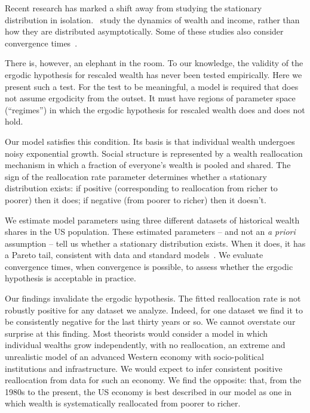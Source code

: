 Recent research has marked a shift away from studying the stationary distribution in isolation.~\cite{gabaix2015dynamics,BermanBen-JacobShapira2016,kaymak2016evolution,berman2017revisiting} study the dynamics of wealth and income, rather than how they are distributed asymptotically. Some of these studies also consider convergence times~\cite{gabaix2015dynamics,berman2017revisiting}.

There is, however, an elephant in the room. To our knowledge, the validity of the ergodic hypothesis for rescaled wealth has never been tested empirically. Here we present such a test. For the test to be meaningful, a model is required that does not assume ergodicity from the outset. It must have regions of parameter space (``regimes'') in which the ergodic hypothesis for rescaled wealth does and does not hold.

Our model satisfies this condition. Its basis is that individual wealth undergoes noisy exponential growth. Social structure is represented by a wealth reallocation mechanism in which a fraction of everyone's wealth is pooled and shared. The sign of the reallocation rate parameter determines whether a stationary distribution exists: if positive (corresponding to reallocation from richer to poorer) then it does; if negative (from poorer to richer) then it doesn't.

We estimate model parameters using three different datasets of historical wealth shares in the US population. These estimated parameters -- and not an {\it a priori} assumption -- tell us whether a stationary distribution exists. When it does, it has a Pareto tail, consistent with data and standard models~\cite{Pareto1897,DragulescuYakovenko2001}. We evaluate convergence times, when convergence is possible, to assess whether the ergodic hypothesis is acceptable in practice.

Our findings invalidate the ergodic hypothesis. The fitted reallocation rate is not robustly positive for any dataset we analyze. Indeed, for one dataset we find it to be consistently negative for the last thirty years or so. We cannot overstate our surprise at this finding. Most theorists would consider a model in which individual wealths grow independently, \ie with no reallocation, an extreme and unrealistic model of an advanced Western economy with socio-political institutions and infrastructure. We would expect to infer consistent positive reallocation from data for such an economy. We find the opposite: that, from the 1980s to the present, the US economy is best described in our model as one in which wealth is systematically reallocated from poorer to richer.

